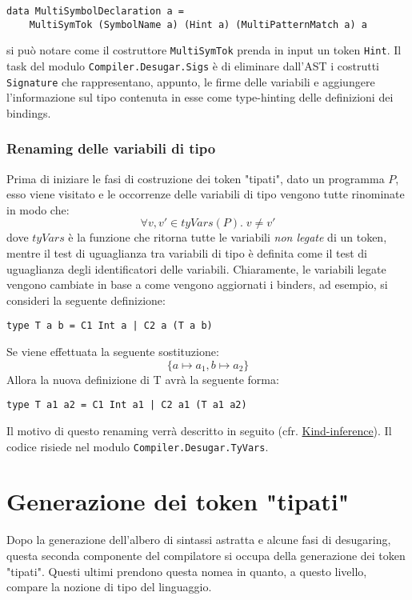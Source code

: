 \documentclass[10pt,a4paper]{article}
\begin{document}
\begin{lstlisting}
data MultiSymbolDeclaration a =
    MultiSymTok (SymbolName a) (Hint a) (MultiPatternMatch a) a
\end{lstlisting}

si può notare come il costruttore \texttt{MultiSymTok} prenda in input un token \texttt{Hint}. Il task del modulo
\texttt{Compiler.Desugar.Sigs} è di eliminare dall'AST i costrutti \texttt{Signature} che rappresentano, appunto, le
firme delle variabili e aggiungere l'informazione sul tipo contenuta in esse come type-hinting delle definizioni dei
bindings.

\subsubsection{Renaming delle variabili di tipo}
Prima di iniziare le fasi di costruzione dei token "tipati", dato un programma $ P $, esso viene visitato e le occorrenze
delle variabili di tipo vengono tutte rinominate in modo che:
\[ \forall v, v' \in tyVars(P). \; v \neq v' \]
dove $ tyVars $ è la funzione che ritorna tutte le variabili \textit{non legate} di un token, mentre il test di uguaglianza
tra variabili di tipo è definita come il test di uguaglianza degli identificatori delle variabili.
Chiaramente, le variabili legate vengono cambiate in base a come vengono aggiornati i binders, ad esempio, si consideri
la seguente definizione:
\begin{lstlisting}
type T a b = C1 Int a | C2 a (T a b)
\end{lstlisting}
Se viene effettuata la seguente sostituzione:
\[ \{ a \mapsto a_1, b \mapsto a_2 \} \]
Allora la nuova definizione di T avrà la seguente forma:
\begin{lstlisting}
type T a1 a2 = C1 Int a1 | C2 a1 (T a1 a2)
\end{lstlisting}
Il motivo di questo renaming verrà descritto in seguito (cfr. \hyperlink{Kind-inference}{Kind-inference}). Il codice
risiede nel modulo \texttt{Compiler.Desugar.TyVars}.

\section{Generazione dei token "tipati"}
Dopo la generazione dell'albero di sintassi astratta e alcune fasi di desugaring, questa seconda componente del
compilatore si occupa della generazione dei token "tipati". Questi ultimi prendono questa nomea in quanto, a questo
livello, compare la nozione di tipo del linguaggio.
\newline
\end{document}
